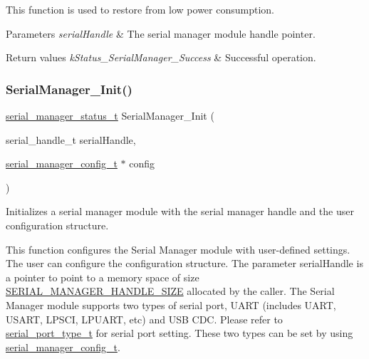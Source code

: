 This function is used to restore from low power consumption.


\begin{DoxyParams}{Parameters}
{\em serial\+Handle} & The serial manager module handle pointer. \\
\hline
\end{DoxyParams}

\begin{DoxyRetVals}{Return values}
{\em k\+Status\+\_\+\+Serial\+Manager\+\_\+\+Success} & Successful operation. \\
\hline
\end{DoxyRetVals}
\mbox{\label{group__serialmanager_gaf8afb0df9a0bd264c5abb318cd8f2e44}} 
\subsubsection{\texorpdfstring{SerialManager\_Init()}{SerialManager\_Init()}}
{\footnotesize\ttfamily \mbox{\hyperlink{group__serialmanager_gac1d9f848c57ca245ad9da8d049369da9}{serial\+\_\+manager\+\_\+status\+\_\+t}} Serial\+Manager\+\_\+\+Init (\begin{DoxyParamCaption}\item[{serial\+\_\+handle\+\_\+t}]{serial\+Handle,  }\item[{\mbox{\hyperlink{group__serialmanager_gaae9cb68d4f20901d9884b690d39a257a}{serial\+\_\+manager\+\_\+config\+\_\+t}} $\ast$}]{config }\end{DoxyParamCaption})}



Initializes a serial manager module with the serial manager handle and the user configuration structure. 

This function configures the Serial Manager module with user-\/defined settings. The user can configure the configuration structure. The parameter serial\+Handle is a pointer to point to a memory space of size \mbox{\hyperlink{group__serialmanager_gabc4aa7ae83c31b66e437d7fd264aaebc}{S\+E\+R\+I\+A\+L\+\_\+\+M\+A\+N\+A\+G\+E\+R\+\_\+\+H\+A\+N\+D\+L\+E\+\_\+\+S\+I\+ZE}} allocated by the caller. The Serial Manager module supports two types of serial port, U\+A\+RT (includes U\+A\+RT, U\+S\+A\+RT, L\+P\+S\+CI, L\+P\+U\+A\+RT, etc) and U\+SB C\+DC. Please refer to \mbox{\hyperlink{group__serialmanager_gaa7dc5f93aacda72d14bb0fa66b0401f3}{serial\+\_\+port\+\_\+type\+\_\+t}} for serial port setting. These two types can be set by using \mbox{\hyperlink{group__serialmanager_gaae9cb68d4f20901d9884b690d39a257a}{serial\+\_\+manager\+\_\+config\+\_\+t}}.


